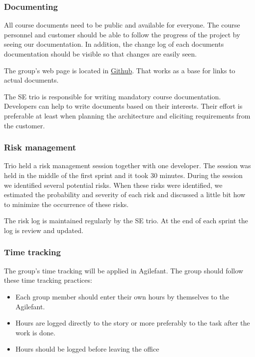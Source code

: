 \subsubsection{Documenting}

All course documents need to be public and available for everyone. The course 
personnel and customer should be able to follow the progress of the project by 
seeing our documentation. In addition, the change log of each documents 
documentation should be visible so that changes are easily seen.

The group's web page is located in 
\href{https://github.com/phyper/mobilefant-documentation/wiki}{Github}. That works as a base for links to actual documents.

The SE trio is responsible for writing mandatory course documentation. 
Developers can help to write documents based on their interests. Their effort 
is preferable at least when planning the architecture and eliciting 
requirements from the customer. 

\subsubsection{Risk management}

Trio held a risk management session together with one developer. The session was held in the middle of the first sprint and it took 30 minutes. During the session we identified several potential risks. When these risks were identified, we estimated the probability and severity of each risk and discussed a little bit how to minimize the occurrence of these risks. 

The risk log is maintained regularly by the SE trio. At the end of each sprint the log is review and updated.

\subsubsection{Time tracking}

The group's time tracking will be applied in Agilefant. The group should follow 
these time tracking practices:
\begin{itemize}
\item Each group member should enter their own hours by themselves to the 
Agilefant.
\item Hours are logged directly to the story or more preferably to the task 
after the work is done. 
\item Hours should be logged before leaving the office
\end{itemize}

